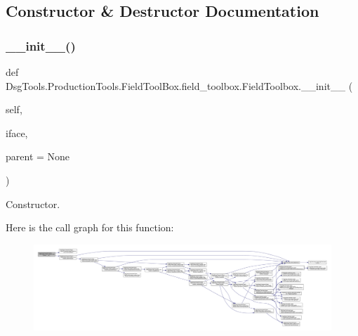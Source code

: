 \subsection{Constructor \& Destructor Documentation}
\mbox{\label{class_dsg_tools_1_1_production_tools_1_1_field_tool_box_1_1field__toolbox_1_1_field_toolbox_a6b312f2aa592e24d41390e4ed5f21b01}} 
\subsubsection{\texorpdfstring{\+\_\+\+\_\+init\+\_\+\+\_\+()}{\_\_init\_\_()}}
{\footnotesize\ttfamily def Dsg\+Tools.\+Production\+Tools.\+Field\+Tool\+Box.\+field\+\_\+toolbox.\+Field\+Toolbox.\+\_\+\+\_\+init\+\_\+\+\_\+ (\begin{DoxyParamCaption}\item[{}]{self,  }\item[{}]{iface,  }\item[{}]{parent = {\ttfamily None} }\end{DoxyParamCaption})}

\begin{DoxyVerb}Constructor.\end{DoxyVerb}
 Here is the call graph for this function\+:
\nopagebreak
\begin{figure}[H]
\begin{center}
\leavevmode
\includegraphics[width=350pt]{class_dsg_tools_1_1_production_tools_1_1_field_tool_box_1_1field__toolbox_1_1_field_toolbox_a6b312f2aa592e24d41390e4ed5f21b01_cgraph}
\end{center}
\end{figure}



